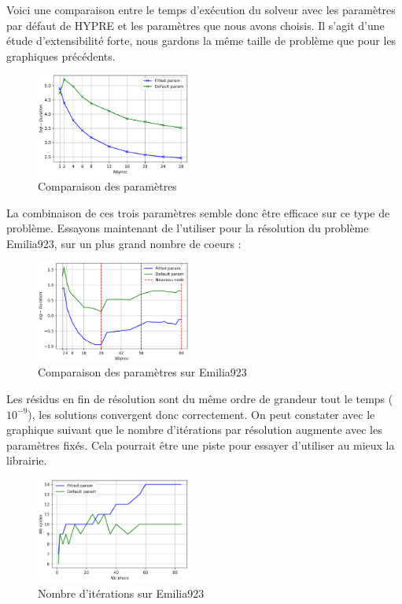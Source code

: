 \documentclass[10pt,twocolumn,letterpaper]{article}
\begin{document}
Voici une comparaison entre le temps d'exécution du solveur avec les  paramètres
par défaut de HYPRE et les paramètres que nous avons choisis. Il s'agit d'une
étude d'extensibilité forte, nous gardons la même taille de problème que pour
les graphiques précédents.

\begin{figure}[H]
  \centering
  \caption{Comparaison des paramètres}
  \includegraphics[width=0.45\textwidth]{fig/strong_best_param.png}
\end{figure}

La combinaison de ces trois paramètres semble donc être efficace sur ce type de
problème. Essayons maintenant de l'utiliser pour la résolution du problème
Emilia923, sur un plus grand nombre de coeurs : 

\begin{figure}[H]
  \centering
  \caption{Comparaison des paramètres sur Emilia923}
  \includegraphics[width=0.45\textwidth]{fig/strong_best_param_emilia.png}
\end{figure}

Les résidus en fin de résolution sont du même ordre de grandeur tout le temps
($10^{-9}$), les solutions convergent donc correctement.
On peut constater avec le graphique suivant que le nombre
d'itérations par résolution augmente avec les paramètres fixés. Cela pourrait
être une piste pour essayer d'utiliser au mieux la librairie.

\begin{figure}[H]
  \centering
  \caption{Nombre d'itérations sur Emilia923}
\includegraphics[width=0.45\textwidth]{fig/strong_best_param_emilia_nbiter.png}
\end{figure}
\end{document}
